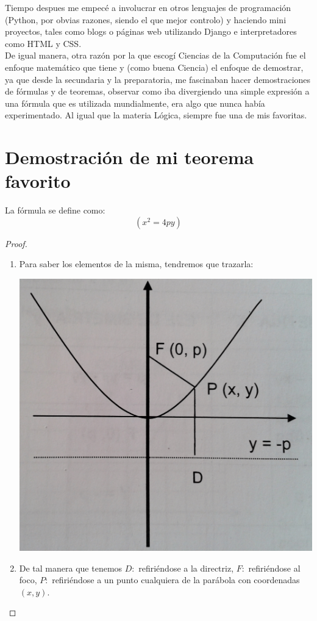 Tiempo despues me empecé a involucrar en otros lenguajes de programación (Python, por obvias razones, siendo el que mejor controlo) y haciendo mini proyectos, tales
como blogs o páginas web utilizando Django e interpretadores como HTML y CSS.
\\

De igual manera, otra razón por la que escogí Ciencias de la Computación fue el enfoque matemático que tiene y (como buena Ciencia) el enfoque de demostrar, ya que
desde la secundaria y la preparatoria, me fascinaban hacer demostraciones de fórmulas y de teoremas, observar como iba divergiendo una simple expresión a una
fórmula que es utilizada mundialmente, era algo que nunca había experimentado. Al igual que la materia Lógica, siempre fue una de mis favoritas.
\\

\section{Demostración de mi teorema favorito}


\begin{teo}
  La fórmula se define como:
  \[
  \left(x^2=4py \right)
  \]
  
\end{teo}

\begin{proof}
  \begin{enumerate}
  \item Para saber los elementos de la misma, tendremos que trazarla:
  \begin{center}
    \includegraphics[scale=0.1]{./parabola.jpg}
  \end{center}
\item De tal manera que tenemos $D:$ refiriéndose a la directriz, $F:$ refiriéndose al foco, $P:$ refiriéndose a un punto cualquiera de la parábola con coordenadas
  $(x,y)$. 
  \end{enumerate}
\end{proof}  


